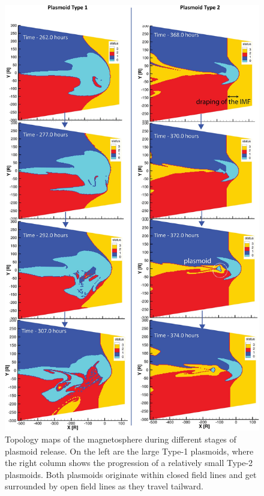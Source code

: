 \begin{figure}
    \centering
    \includegraphics[height=0.9\textheight]{images4/status-fieldlines-magnetosphere.jpg}
    \caption{Topology maps of the magnetosphere during different stages of plasmoid release. On the left are the large Type-1 plasmoids, where the right column shows the progression of a relatively small Type-2 plasmoids. Both plasmoids originate within closed field lines and get surrounded by open field lines as they travel tailward.}
    \label{fig:status-magnetosphere}
\end{figure}

